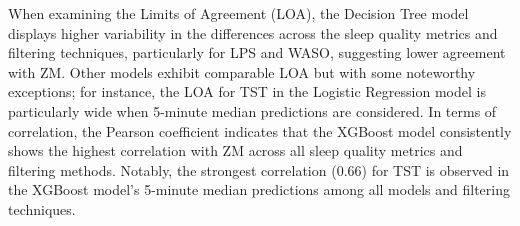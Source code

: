 \documentclass[
  10pt,
]{scrbook}
\begin{document}
When examining the Limits of Agreement (LOA), the Decision Tree model
displays higher variability in the differences across the sleep quality
metrics and filtering techniques, particularly for LPS and WASO,
suggesting lower agreement with ZM. Other models exhibit comparable LOA
but with some noteworthy exceptions; for instance, the LOA for TST in
the Logistic Regression model is particularly wide when 5-minute median
predictions are considered. In terms of correlation, the Pearson
coefficient indicates that the XGBoost model consistently shows the
highest correlation with ZM across all sleep quality metrics and
filtering methods. Notably, the strongest correlation (0.66) for TST is
observed in the XGBoost model's 5-minute median predictions among all
models and filtering techniques.

\begingroup

\footnotesize
\end{document}

